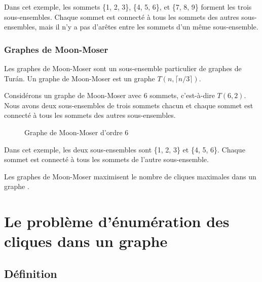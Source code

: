 \documentclass[12pt,a4paper]{article}
\begin{document}
Dans cet exemple, les sommets \{1, 2, 3\}, \{4, 5, 6\}, et \{7, 8, 9\} forment les trois sous-ensembles. Chaque sommet est connecté à tous les sommets des autres sous-ensembles, mais il n'y a pas d'arêtes entre les sommets d'un même sous-ensemble.

\subsubsection*{Graphes de Moon-Moser}
\label{subsubsec:mm}

Les graphes de Moon-Moser sont un sous-ensemble particulier de graphes de Turán. Un graphe de Moon-Moser est un graphe \( T(n, \lceil n/3 \rceil) \).

Considérons un graphe de Moon-Moser avec 6 sommets, c'est-à-dire \( T(6, 2) \). Nous avons deux sous-ensembles de trois sommets chacun et chaque sommet est connecté à tous les sommets des autres sous-ensembles.

\begin{figure}[h!]
    \centering
    \caption{Graphe de Moon-Moser d'ordre 6}
    \label{fig:moon-moser}
\end{figure}

Dans cet exemple, les deux sous-ensembles sont \{1, 2, 3\} et \{4, 5, 6\}. Chaque sommet est connecté à tous les sommets de l'autre sous-ensemble.

Les graphes de Moon-Moser maximisent le nombre de cliques maximales dans un graphe \cite{MR0182577}.

\section{Le problème d'énumération des cliques dans un graphe}

\subsection{Définition}%
\label{subsec:def_prob}
\end{document}
